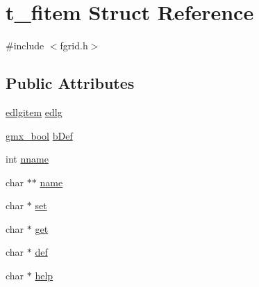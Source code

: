 \hypertarget{structt__fitem}{\section{t\-\_\-fitem \-Struct \-Reference}
\label{structt__fitem}
}


{\ttfamily \#include $<$fgrid.\-h$>$}

\subsection*{\-Public \-Attributes}
\begin{DoxyCompactItemize}
\item 
\hyperlink{xdlgitem_8h_a48a67f56004b9395af9513ddbb49a8e6}{edlgitem} \hyperlink{structt__fitem_a97de1b38b2633aedc1c0b6907a2f7a73}{edlg}
\item 
\hyperlink{include_2types_2simple_8h_a8fddad319f226e856400d190198d5151}{gmx\-\_\-bool} \hyperlink{structt__fitem_a8ce1832f0645f987d8ecd7b931d04858}{b\-Def}
\item 
int \hyperlink{structt__fitem_aeefc9ba4d6925ebd9c6f8a6ed343d3d2}{nname}
\item 
char $\ast$$\ast$ \hyperlink{structt__fitem_aca94f079be77d1c33cab4f9294db708b}{name}
\item 
char $\ast$ \hyperlink{structt__fitem_a2a9115dd516b2b813e450f3af7c193d1}{set}
\item 
char $\ast$ \hyperlink{structt__fitem_a74b94c69ba0bd162ea80942c823e1a5c}{get}
\item 
char $\ast$ \hyperlink{structt__fitem_a87715111036583996d2501bfbd31b724}{def}
\item 
char $\ast$ \hyperlink{structt__fitem_adbd5fc707505e2211a06ead495a31de3}{help}
\end{DoxyCompactItemize}


